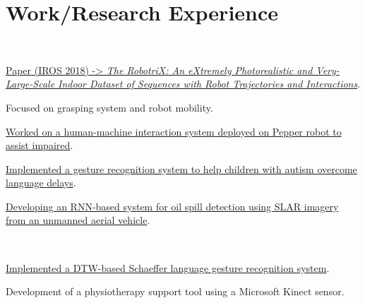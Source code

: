 \documentclass[]{deedy-resume-openfont}
\begin{document}
\begin{minipage}[t]{0.495\textwidth} 


\section{Work/Research Experience}

 \\
\vspace{\topsep} %
\begin{tightemize}
	\item \href{https://www.youtube.com/watch?v=CiRc5tCtCak}{ Paper (IROS 2018) -> \textit{The RobotriX: An eXtremely Photorealistic and Very-Large-Scale Indoor Dataset of Sequences with Robot Trajectories and Interactions}}. 
	\item Focused on grasping system and robot mobility.
\end{tightemize}

\begin{tightemize}
\item \href{http://www.sciencedirect.com/science/article/pii/S0167865517301903}{Worked on a human-machine interaction system deployed on Pepper robot to assist impaired}.
\item \href{https://doi.org/10.1111/exsy.12247}{ Implemented a gesture recognition system to help children with autism overcome language delays}. 
\end{tightemize}

\begin{tightemize}
\item \href{http://www.scitepress.org/PublicationsDetail.aspx?ID=iZhu5TbsCgU=&t=1}{Developing an RNN-based system for oil spill detection using SLAR imagery from an unmanned aerial vehicle}.
\end{tightemize}
\sectionsep

\\
\begin{tightemize}
\item \href{https://www.youtube.com/watch?v=71XN0S43BXQ}{Implemented a DTW-based Schaeffer language gesture recognition system}.
\end{tightemize}
\begin{tightemize}
\item Development of a physiotherapy support tool using a Microsoft Kinect sensor.
\end{tightemize}
\sectionsep


\end{minipage}
\end{document}
